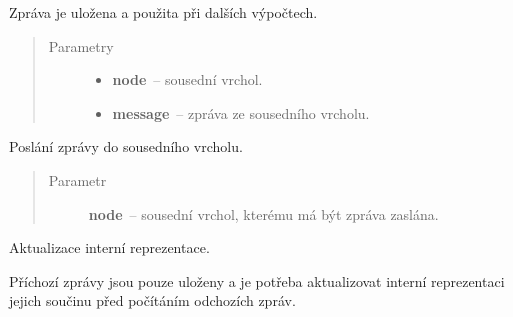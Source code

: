 \begin{fulllineitems}
\begin{fulllineitems}
Zpráva je uložena a použita při dalších výpočtech.
\begin{quote}\begin{description}
\item[{Parametry}] \leavevmode\begin{itemize}
\item {} 
\textbf{node}~-- sousední vrchol.

\item {} 
\textbf{message}~-- zpráva ze sousedního vrcholu.

\end{itemize}

\end{description}\end{quote}

\end{fulllineitems}


\begin{fulllineitems}
\label{alex.infer:alex.infer.factor.alex.infer.node.DirichletFactorNode.message_to}
Poslání zprávy do sousedního vrcholu.
\begin{quote}\begin{description}
\item[{Parametr}] \leavevmode
\textbf{node}~-- sousední vrchol, kterému má být zpráva zaslána.

\end{description}\end{quote}

\end{fulllineitems}


\begin{fulllineitems}
\label{alex.infer:alex.infer.factor.alex.infer.node.DirichletFactorNode.update}
Aktualizace interní reprezentace.

Příchozí zprávy jsou pouze uloženy a je potřeba aktualizovat interní
reprezentaci jejich součinu před počítáním odchozích zpráv.

\end{fulllineitems}


\end{fulllineitems}




